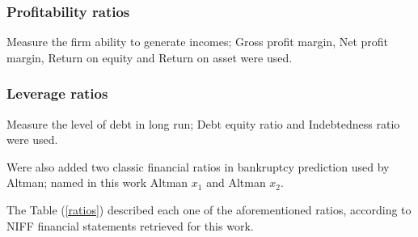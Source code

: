 \documentclass[journal]{IEEEtai}
\begin{document}
\subsubsection{Profitability ratios}
Measure the firm ability to generate incomes;
Gross profit margin, Net profit margin, Return on equity and Return on asset were used.



\subsubsection{Leverage ratios}
Measure the level of debt in long run;
Debt equity ratio and Indebtedness ratio were used.

Were also added two classic financial ratios in bankruptcy prediction used by Altman; named in this work Altman $x_{1}$ and Altman $x_{2}$.

The Table (\ref{ratios}) described each one of the aforementioned ratios, according to NIFF financial statements retrieved for this work.
\end{document}
